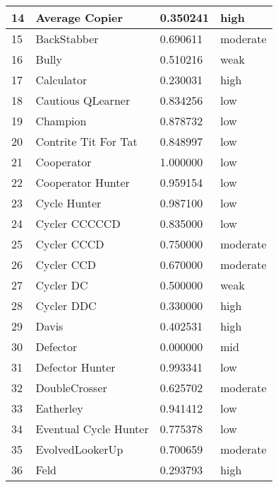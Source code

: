 \begin{longtable}{|p{0.5cm}||p{6cm}||p{4cm}||p{2cm}|}
			14  & Average Copier              & 0.350241          & high     \\ \hline
			15  & BackStabber                 & 0.690611          & moderate \\ \hline
			16  & Bully                       & 0.510216          & weak     \\ \hline
			17  & Calculator                  & 0.230031          & high     \\ \hline
			18  & Cautious QLearner           & 0.834256          & low      \\ \hline
			19  & Champion                    & 0.878732          & low      \\ \hline
			20  & Contrite Tit For Tat        & 0.848997          & low      \\ \hline
			21  & Cooperator                  & 1.000000          & low      \\ \hline
			22  & Cooperator Hunter           & 0.959154          & low      \\ \hline
			23  & Cycle Hunter                & 0.987100          & low      \\ \hline
			24  & Cycler CCCCCD               & 0.835000          & low      \\ \hline
			25  & Cycler CCCD                 & 0.750000          & moderate \\ \hline
			26  & Cycler CCD                  & 0.670000          & moderate \\ \hline
			27  & Cycler DC                   & 0.500000          & weak     \\ \hline
			28  & Cycler DDC                  & 0.330000          & high     \\ \hline
			29  & Davis                       & 0.402531          & high     \\ \hline
			30  & Defector                    & 0.000000          & mid      \\ \hline
			31  & Defector Hunter             & 0.993341          & low      \\ \hline
			32  & DoubleCrosser               & 0.625702          & moderate \\ \hline
			33  & Eatherley                   & 0.941412          & low      \\ \hline
			34  & Eventual Cycle Hunter       & 0.775378          & low      \\ \hline
			35  & EvolvedLookerUp             & 0.700659          & moderate \\ \hline
			36  & Feld                        & 0.293793          & high     \\ \hline

\end{longtable}
